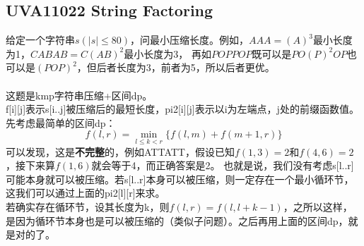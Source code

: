     \subsection{UVA11022 String Factoring}
        给定一个字符串$s(|s| \le 80)$，问最小压缩长度。例如，$AAA=(A)^3$最小长度为1，$CABAB=C(AB)^2$最小长度为3，
        再如$POPPOP$既可以是$PO(P)^2OP$也可以是$(POP)^2$，但后者长度为3，前者为5，所以后者更优。\\\\
        这题是kmp字符串压缩+区间dp。\\
        f[i][j]表示s[i..j]被压缩后的最短长度，pi2[i][j]表示以i为左端点，j处的前缀函数值。先考虑最简单的区间dp：
        $$f(l,r)=\min_{l \le k < r}{\{f(l,m)+f(m+1,r)\}}$$
        可以发现，这是\textbf{不完整}的，例如ATTATT，假设已知$f(1,3)=2$和$f(4,6)=2$，接下来算$f(1,6)$就会等于4，而正确答案是2。
        也就是说，我们没有考虑s[l..r]可能本身就可以被压缩。若s[l..r]本身可以被压缩，则一定存在一个最小循环节，这我们可以通过上面的pi2[l][r]来求。\\
        若确实存在循环节，设其长度为k，则$f(l,r)=f(l,l+k-1)$，之所以这样，是因为循环节本身也是可以被压缩的（类似子问题）。之后再用上面的区间dp，就是对的了。
